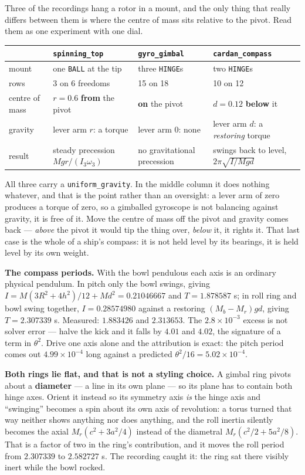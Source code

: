 \documentclass[11pt]{article}
\newcommand{\kw}[1]{\texttt{\uppercase{#1}}}
\newcommand{\code}[1]{\texttt{#1}}
\begin{document}
Three of the recordings hang a rotor in a mount, and the only thing
that really differs between them is where the centre of mass sits
relative to the pivot. Read them as one experiment with one dial.

\begin{center}
\begin{tabular}{p{2.4cm}p{3.7cm}p{3.2cm}p{3.7cm}}
& \code{spinning\_top} & \code{gyro\_gimbal} & \code{cardan\_compass}\\\hline
mount & one \kw{ball} at the tip & three \kw{hinge}s & two \kw{hinge}s\\
rows & 3 on 6 freedoms & 15 on 18 & 10 on 12\\
centre of mass & $r = 0.6$ \textbf{from} the pivot & \textbf{on} the
pivot & $d = 0.12$ \textbf{below} it\\
gravity & lever arm $r$: a torque & lever arm 0: none & lever arm $d$: a
\emph{restoring} torque\\
result & steady precession $Mgr/(I_3\omega_3)$ & no gravitational
precession & swings back to level, $2\pi\sqrt{I/Mgd}$\\
\end{tabular}
\end{center}

All three carry a \code{uniform\_gravity}. In the middle column it does
nothing whatever, and that is the point rather than an oversight: a
lever arm of zero produces a torque of zero, so a gimballed gyroscope
is not balancing against gravity, it is free of it. Move the centre of
mass off the pivot and gravity comes back --- \emph{above} the pivot it
would tip the thing over, \emph{below} it, it rights it. That last case
is the whole of a ship's compass: it is not held level by its bearings,
it is held level by its own weight.

\textbf{The compass periods.} With the bowl pendulous each axis is an
ordinary physical pendulum. In pitch only the bowl swings, giving
$I = M(3R^2+4h^2)/12 + Md^2 = 0.21046667$ and $T = 1.878587$ s; in roll
ring and bowl swing together, $I = 0.28574980$ against a restoring
$(M_b - M_r)gd$, giving $T = 2.307339$ s. Measured: $1.883426$ and
$2.313653$. The $2.8\times10^{-3}$ excess is not solver error --- halve
the kick and it falls by $4.01$ and $4.02$, the signature of a term in
$\theta^2$. Drive one axis alone and the attribution is exact: the
pitch period comes out $4.99\times10^{-4}$ long against a predicted
$\theta^2/16 = 5.02\times10^{-4}$.

\textbf{Both rings lie flat, and that is not a styling choice.} A
gimbal ring pivots about a \textbf{diameter} --- a line in its own plane
--- so its plane has to contain both hinge axes. Orient it instead so
its symmetry axis \emph{is} the hinge axis and ``swinging'' becomes a
spin about its own axis of revolution: a torus turned that way neither
shows anything nor does anything, and the roll inertia silently becomes
the axial $M_r(c^2 + 3a^2/4)$ instead of the diametral
$M_r(c^2/2 + 5a^2/8)$. That is a factor of two in the ring's
contribution, and it moves the roll period from $2.307339$ to
$2.582727$ s. The recording caught it: the ring sat there visibly inert
while the bowl rocked.
\end{document}
